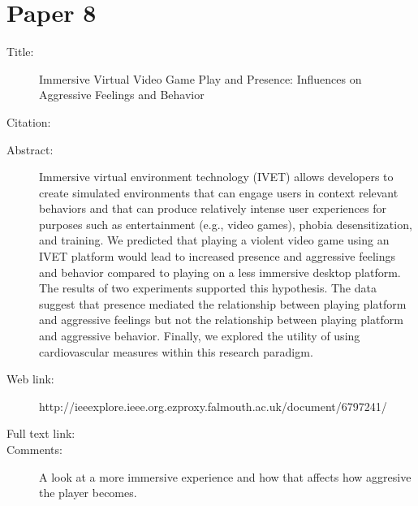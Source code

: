 \documentclass{scrartcl}
\begin{document}
\section*{Paper 8}
\begin{description}
\item[Title:] Immersive Virtual Video Game Play and Presence: Influences on Aggressive Feelings and Behavior
\item[Citation:] \cite{immersive}
\item[Abstract:] Immersive virtual environment technology (IVET) allows developers to create simulated environments that can engage users in context relevant behaviors and that can produce relatively intense user experiences for purposes such as entertainment (e.g., video games), phobia desensitization, and training. We predicted that playing a violent video game using an IVET platform would lead to increased presence and aggressive feelings and behavior compared to playing on a less immersive desktop platform. The results of two experiments supported this hypothesis. The data suggest that presence mediated the relationship between playing platform and aggressive feelings but not the relationship between playing platform and aggressive behavior. Finally, we explored the utility of using cardiovascular measures within this research paradigm.
\item[Web link:] http://ieeexplore.ieee.org.ezproxy.falmouth.ac.uk/document/6797241/
\item[Full text link:] 
\item[Comments:]  A look at a more immersive experience and how that affects how aggresive the player becomes. 
\end{description}
\end{document}
